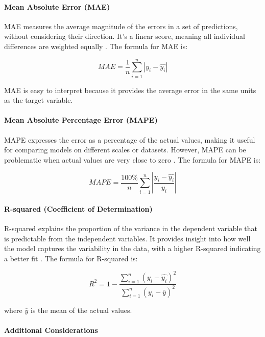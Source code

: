\documentclass[11pt,a4paper,]{article}
\begin{document}
\paragraph{Mean Absolute Error (MAE)}\label{mean-absolute-error-mae}

MAE measures the average magnitude of the errors in a set of predictions, without considering their direction. It's a linear score, meaning all individual differences are weighted equally \autocite{ISLR,Hastie09}. The formula for MAE is:

\[MAE = \frac{1}{n} {\sum^n_{i=1}|y_i-\hat{y_i}|}\]

MAE is easy to interpret because it provides the average error in the same units as the target variable.

\paragraph{Mean Absolute Percentage Error (MAPE)}\label{mean-absolute-percentage-error-mape}

MAPE expresses the error as a percentage of the actual values, making it useful for comparing models on different scales or datasets. However, MAPE can be problematic when actual values are very close to zero \autocite{ISLR,Hastie09}. The formula for MAPE is:

\[MAPE = \frac{100\%}{n} {\sum^n_{i=1}|\frac{y_i-\hat{y_i}}{y_i}|}\]

\paragraph{R-squared (Coefficient of Determination)}\label{r-squared-coefficient-of-determination}

R-squared explains the proportion of the variance in the dependent variable that is predictable from the independent variables. It provides insight into how well the model captures the variability in the data, with a higher R-squared indicating a better fit \autocite{ISLR,Hastie09}. The formula for R-squared is:

\[R^2 = 1-\frac{\sum^n_{i=1}(y_i-\hat{y_i})^2}{\sum^n_{i=1}(y_i-\bar{y})^2}\]

where \(\bar{y}\) is the mean of the actual values.

\paragraph{Additional Considerations}\label{additional-considerations}
\end{document}
